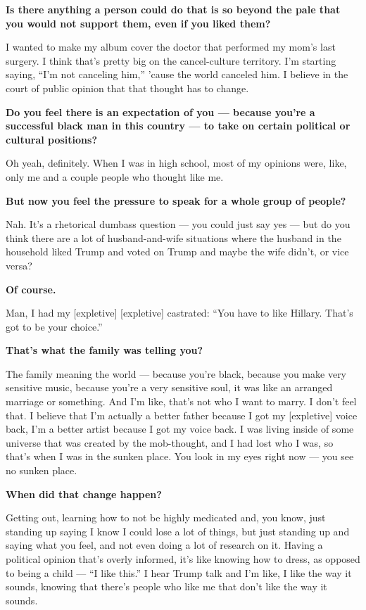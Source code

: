 \textbf{Is there anything a person could do that is so beyond the pale
that you would not support them, even if you liked them?}

I wanted to make my album cover the doctor that performed my mom's last
surgery. I think that's pretty big on the cancel-culture territory. I'm
starting saying, ``I'm not canceling him,'' 'cause the world canceled
him. I believe in the court of public opinion that that thought has to
change.

\textbf{Do you feel there is an expectation of you --- because you're a
successful black man in this country --- to take on certain political or
cultural positions?}

Oh yeah, definitely. When I was in high school, most of my opinions
were, like, only me and a couple people who thought like me.

\textbf{But now you feel the pressure to speak for a whole group of
people?}

Nah. It's a rhetorical dumbass question --- you could just say yes ---
but do you think there are a lot of husband-and-wife situations where
the husband in the household liked Trump and voted on Trump and maybe
the wife didn't, or vice versa?

\textbf{Of course.}

Man, I had my {[}expletive{]} {[}expletive{]} castrated: ``You have to
like Hillary. That's got to be your choice.''

\textbf{That's what the family was telling you?}

The family meaning the world --- because you're black, because you make
very sensitive music, because you're a very sensitive soul, it was like
an arranged marriage or something. And I'm like, that's not who I want
to marry. I don't feel that. I believe that I'm actually a better father
because I got my {[}expletive{]} voice back, I'm a better artist because
I got my voice back. I was living inside of some universe that was
created by the mob-thought, and I had lost who I was, so that's when I
was in the sunken place. You look in my eyes right now --- you see no
sunken place.

\textbf{When did that change happen?}

Getting out, learning how to not be highly medicated and, you know, just
standing up saying I know I could lose a lot of things, but just
standing up and saying what you feel, and not even doing a lot of
research on it. Having a political opinion that's overly informed, it's
like knowing how to dress, as opposed to being a child --- ``I like
this.'' I hear Trump talk and I'm like, I like the way it sounds,
knowing that there's people who like me that don't like the way it
sounds.

